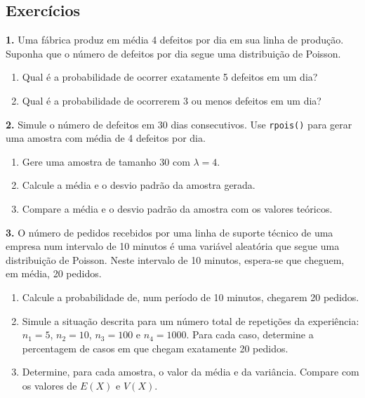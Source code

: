 \documentclass[
]{book}
\providecommand{\tightlist}{%
  \setlength{\itemsep}{0pt}\setlength{\parskip}{0pt}}
\begin{document}
\subsection{Exercícios}\label{exercuxedcios-28}

\textbf{1.} Uma fábrica produz em média 4 defeitos por dia em sua linha de produção. Suponha que o número de defeitos por dia segue uma distribuição de Poisson.

\begin{enumerate}
\def\labelenumi{(\alph{enumi})}
\tightlist
\item
  Qual é a probabilidade de ocorrer exatamente 5 defeitos em um dia?
\item
  Qual é a probabilidade de ocorrerem 3 ou menos defeitos em um dia?
\end{enumerate}

\textbf{2.} Simule o número de defeitos em 30 dias consecutivos. Use \texttt{rpois()} para gerar uma amostra com média de 4 defeitos por dia.

\begin{enumerate}
\def\labelenumi{(\alph{enumi})}
\tightlist
\item
  Gere uma amostra de tamanho 30 com \(\lambda = 4\).
\item
  Calcule a média e o desvio padrão da amostra gerada.
\item
  Compare a média e o desvio padrão da amostra com os valores teóricos.
\end{enumerate}

\textbf{3.} O número de pedidos recebidos por uma linha de suporte
técnico de uma empresa num intervalo de 10 minutos é uma variável
aleatória que segue uma distribuição de Poisson. Neste intervalo de 10
minutos, espera-se que cheguem, em média, 20 pedidos.

\begin{enumerate}
\def\labelenumi{(\alph{enumi})}
\item
  Calcule a probabilidade de, num período de 10 minutos, chegarem 20
  pedidos.
\item
  Simule a situação descrita para um número total de repetições da
  experiência: \(n_1=5\), \(n_2=10\), \(n_3=100\) e \(n_4=1000\). Para cada
  caso, determine a percentagem de casos em que chegam exatamente 20
  pedidos.
\item
  Determine, para cada amostra, o valor da média e da variância.
  Compare com os valores de \(E(X)\) e \(V(X)\).
\end{enumerate}
\end{document}
